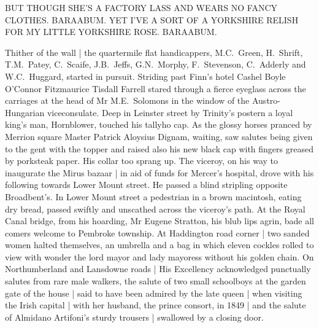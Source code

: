     BUT THOUGH SHE'S A FACTORY LASS
    AND WEARS NO FANCY CLOTHES.
    BARAABUM.
    YET I'VE A SORT OF A
    YORKSHIRE RELISH FOR
    MY LITTLE YORKSHIRE ROSE.
    BARAABUM.


Thither of the wall |
the quartermile flat handicappers,
M.C.~Green,
H.~Shrift,
T.M.~Patey,
C.~Scaife,
J.B.~Jeffs,
G.N.~Morphy,
F.~Stevenson,
C.~Adderly
and W.C.~Huggard,
started in pursuit.
Striding past Finn's
hotel
Cashel Boyle O'Connor Fitzmaurice Tisdall Farrell
stared through a
fierce eyeglass
across the carriages
at the head of Mr M.E.~Solomons
in the window of the Austro-Hungarian viceconsulate.
Deep in Leinster street
by Trinity's postern
a loyal king's man, Hornblower,
touched his tallyho
cap.
As the glossy horses pranced by Merrion square
Master Patrick
Aloysius Dignam, waiting,
saw salutes being given
to the gent with the
topper
and raised also his new black cap
with fingers greased by
porksteak paper.
His collar too sprang up.
The viceroy,
on his way to inaugurate the Mirus bazaar |
in aid of funds for Mercer's hospital,
drove with his following
towards Lower Mount street.
He passed a blind stripling opposite Broadbent's.
In Lower Mount street
a pedestrian in a brown macintosh,
eating dry bread,
passed swiftly and unscathed across the viceroy's path.
At the Royal Canal bridge,
from his hoarding,
Mr Eugene Stratton,
his blub lips agrin,
bade all comers welcome to Pembroke township.
At Haddington road corner |
two sanded women halted themselves,
an umbrella and a bag in which eleven cockles
rolled to view with wonder
the lord mayor and lady mayoress without his golden chain.
On Northumberland and Lansdowne roads |
His Excellency acknowledged punctually
salutes from rare male walkers,
the salute of two small schoolboys
at the garden gate of the house |
said to have been admired by the late queen |
when visiting the Irish capital |
with her husband, the prince consort, in 1849 |
and the salute of Almidano Artifoni's sturdy trousers |
swallowed by a closing door.
